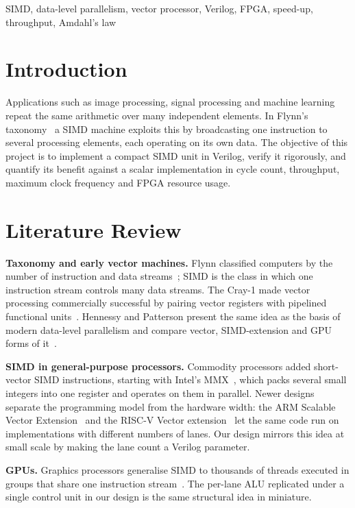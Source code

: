 \documentclass[conference]{IEEEtran}
\begin{document}
\begin{IEEEkeywords}
SIMD, data-level parallelism, vector processor, Verilog, FPGA, speed-up, throughput, Amdahl's law
\end{IEEEkeywords}

\section{Introduction}
Applications such as image processing, signal processing and machine learning repeat the same arithmetic over many independent elements. In Flynn's taxonomy~\cite{flynn1972} a SIMD machine exploits this by broadcasting one instruction to several processing elements, each operating on its own data. The objective of this project is to implement a compact SIMD unit in Verilog, verify it rigorously, and quantify its benefit against a scalar implementation in cycle count, throughput, maximum clock frequency and FPGA resource usage.

\section{Literature Review}
\textbf{Taxonomy and early vector machines.} Flynn classified computers by the number of instruction and data streams~\cite{flynn1966,flynn1972}; SIMD is the class in which one instruction stream controls many data streams. The Cray-1 made vector processing commercially successful by pairing vector registers with pipelined functional units~\cite{russell1978}. Hennessy and Patterson present the same idea as the basis of modern data-level parallelism and compare vector, SIMD-extension and GPU forms of it~\cite{hennessy2019}.

\textbf{SIMD in general-purpose processors.} Commodity processors added short-vector SIMD instructions, starting with Intel's MMX~\cite{peleg1996}, which packs several small integers into one register and operates on them in parallel. Newer designs separate the programming model from the hardware width: the ARM Scalable Vector Extension~\cite{stephens2017} and the RISC-V Vector extension~\cite{riscvv} let the same code run on implementations with different numbers of lanes. Our design mirrors this idea at small scale by making the lane count a Verilog parameter.

\textbf{GPUs.} Graphics processors generalise SIMD to thousands of threads executed in groups that share one instruction stream~\cite{lindholm2008}. The per-lane ALU replicated under a single control unit in our design is the same structural idea in miniature.
\end{document}
